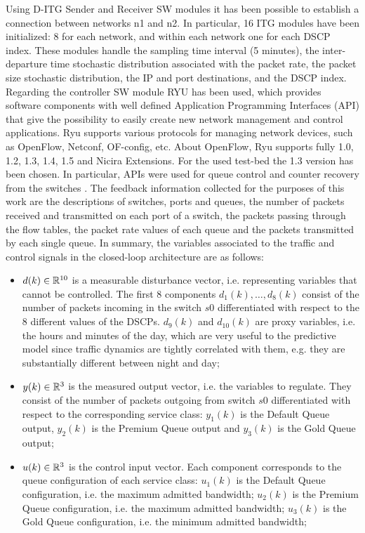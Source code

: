Using D-ITG Sender and Receiver SW modules it has been possible to establish a connection between networks n1 and n2. In particular, 16 ITG modules have been initialized: 8 for each network, and within each network one for each DSCP index. These modules handle the sampling time interval (5 minutes), the inter-departure time stochastic distribution associated with the packet rate, the packet size stochastic distribution, the IP and port destinations, and the DSCP index. Regarding the controller SW module RYU has been used, which provides software components with well defined Application Programming Interfaces (API) that give the possibility to easily create new network management and control applications. Ryu supports various protocols for managing network devices, such as OpenFlow, Netconf, OF-config, etc. About OpenFlow, Ryu supports fully 1.0, 1.2, 1.3, 1.4, 1.5 and Nicira Extensions. For the used test-bed the 1.3 version has been chosen. In particular, APIs were used for queue control and counter recovery from the switches \cite{ofctlrest,QoS}. The feedback information collected for the purposes of this work are the descriptions of switches, ports and queues, the number of packets received and transmitted on each port of a switch, the packets passing through the flow tables, the packet rate values of each queue and the packets transmitted by each single queue. In summary, the variables associated to the traffic and control signals in the closed-loop architecture are as follows:

\begin{itemize}
	\item $d(k)\in\mathbb{R}^{10}$ is a measurable disturbance vector, i.e. representing variables that cannot be controlled. The first 8 components $d_1(k),\ldots,d_8(k)$ consist of the number of packets incoming in the switch $s0$ differentiated with respect to the 8 different values of the DSCPs. $d_9(k)$ and $d_{10}(k)$ are proxy variables, i.e. the hours and minutes of the day, which are very useful to the predictive model since traffic dynamics are tightly correlated with them, e.g. they are substantially different between night and day;
	\item $y(k)\in\mathbb{R}^{3}$ is the measured output vector, i.e. the variables to regulate. They consist of the number of packets outgoing from switch $s0$ differentiated with respect to the corresponding service class: $y_1(k)$ is the Default Queue output, $y_2(k)$ is the Premium Queue output and $y_3(k)$ is the Gold Queue output;
	\item $u(k)\in\mathbb{R}^{3}$ is the control input vector. Each component corresponds to the queue configuration of each service class: $u_1(k)$ is the Default Queue configuration, i.e. the maximum admitted bandwidth; $u_2(k)$ is the Premium Queue configuration, i.e. the maximum admitted bandwidth; $u_3(k)$ is the Gold Queue configuration, i.e. the minimum admitted bandwidth;
\end{itemize}


